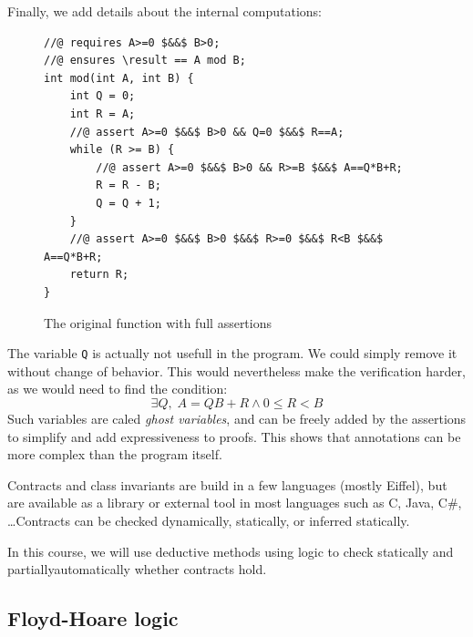 \documentclass[toc]{../cs-classes/cs-classes}
\begin{document}
Finally, we add details about the internal computations:
\begin{figure}[H]
    \centering
    \begin{minipage}{0.7\textwidth}
        \begin{verbatim}
//@ requires A>=0 $&&$ B>0;
//@ ensures \result == A mod B;
int mod(int A, int B) {
    int Q = 0;
    int R = A;
    //@ assert A>=0 $&&$ B>0 && Q=0 $&&$ R==A;
    while (R >= B) {
        //@ assert A>=0 $&&$ B>0 && R>=B $&&$ A==Q*B+R;
        R = R - B;
        Q = Q + 1;
    }
    //@ assert A>=0 $&&$ B>0 $&&$ R>=0 $&&$ R<B $&&$ A==Q*B+R;
    return R;
}
        \end{verbatim}
    \end{minipage}
    \caption{The original function with full assertions}
\end{figure}

\begin{remark}
    The variable \texttt{Q} is actually not usefull in the program. We could simply remove it without change of behavior. This would nevertheless make the verification harder, as we would need to find the condition:
    \begin{equation*}
        \exists Q, \; A=QB+R \land 0\leq R<B
    \end{equation*}
    Such variables are caled \emph{ghost variables}, and can be freely added by the assertions to simplify and add expressiveness to proofs. This shows that annotations can be more complex than the program itself.
\end{remark}

Contracts and class invariants are build in a few languages (mostly Eiffel), but are available as a library or external tool in most languages such as C, Java, C\#, \dots Contracts can be checked dynamically, statically, or inferred statically.

In this course, we will use deductive methods using logic to check statically and partiallyautomatically whether contracts hold.

\subsection{Floyd-Hoare logic}
\end{document}
